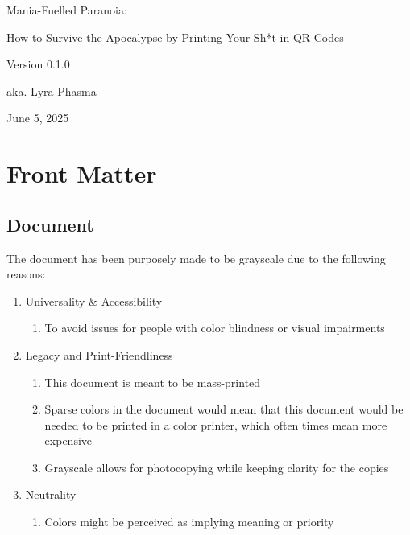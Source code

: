 

\begin{titlepage}
  \centering
  \vspace*{\fill}

  {\fontsize{2.75em}{3.5em}\selectfont\ManropeExtraBold Mania-Fuelled Paranoia: \par}
  {\HUGE How to Survive the Apocalypse by Printing Your Sh*t in QR Codes \par}
  {\Large Version 0.1.0 \par}
  {\Large aka. Lyra Phasma \par}
  {\Large June 5, 2025 \par}

  \vspace*{\fill}
\end{titlepage}

\tableofcontents

\chapter{Front Matter}

\section{Document}

The document has been purposely made to be grayscale due to the following reasons:

\begin{enumerate}
  \item Universality \& Accessibility
    \begin{enumerate}[label=\alph*.]
      \item To avoid issues for people with color blindness or visual impairments
    \end{enumerate}
  \item Legacy and Print-Friendliness
    \begin{enumerate}[label=\alph*.]
      \item This document is meant to be mass-printed
      \item Sparse colors in the document would mean that this document would be needed to be printed in a color printer, which often times mean more expensive
      \item Grayscale allows for photocopying while keeping clarity for the copies
    \end{enumerate}
  \item Neutrality
    \begin{enumerate}[label=\alph*.]
      \item Colors might be perceived as implying meaning or priority
    \end{enumerate}
\end{enumerate}

